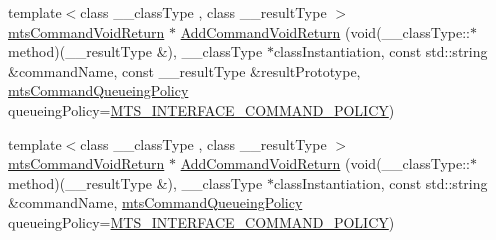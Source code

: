 {\bf }\par
\begin{DoxyCompactItemize}
\item 
{\footnotesize template$<$class \-\_\-\-\_\-class\-Type , class \-\_\-\-\_\-result\-Type $>$ }\\\hyperlink{classmts_command_void_return}{mts\-Command\-Void\-Return} $\ast$ \hyperlink{classmts_interface_provided_a3581289439afcdc0bd93120ae896e45e}{Add\-Command\-Void\-Return} (void(\-\_\-\-\_\-class\-Type\-::$\ast$method)(\-\_\-\-\_\-result\-Type \&), \-\_\-\-\_\-class\-Type $\ast$class\-Instantiation, const std\-::string \&command\-Name, const \-\_\-\-\_\-result\-Type \&result\-Prototype, \hyperlink{mts_forward_declarations_8h_aa2ac24035e136fa1689dcc2854c63fc7}{mts\-Command\-Queueing\-Policy} queueing\-Policy=\hyperlink{mts_forward_declarations_8h_aa2ac24035e136fa1689dcc2854c63fc7a4f444b4120a5e2efd084e2e5a214f5c8}{M\-T\-S\-\_\-\-I\-N\-T\-E\-R\-F\-A\-C\-E\-\_\-\-C\-O\-M\-M\-A\-N\-D\-\_\-\-P\-O\-L\-I\-C\-Y})
\item 
{\footnotesize template$<$class \-\_\-\-\_\-class\-Type , class \-\_\-\-\_\-result\-Type $>$ }\\\hyperlink{classmts_command_void_return}{mts\-Command\-Void\-Return} $\ast$ \hyperlink{classmts_interface_provided_a6fcfd4d08641e7ee3e428c8be4f33d22}{Add\-Command\-Void\-Return} (void(\-\_\-\-\_\-class\-Type\-::$\ast$method)(\-\_\-\-\_\-result\-Type \&), \-\_\-\-\_\-class\-Type $\ast$class\-Instantiation, const std\-::string \&command\-Name, \hyperlink{mts_forward_declarations_8h_aa2ac24035e136fa1689dcc2854c63fc7}{mts\-Command\-Queueing\-Policy} queueing\-Policy=\hyperlink{mts_forward_declarations_8h_aa2ac24035e136fa1689dcc2854c63fc7a4f444b4120a5e2efd084e2e5a214f5c8}{M\-T\-S\-\_\-\-I\-N\-T\-E\-R\-F\-A\-C\-E\-\_\-\-C\-O\-M\-M\-A\-N\-D\-\_\-\-P\-O\-L\-I\-C\-Y})
\end{DoxyCompactItemize}

